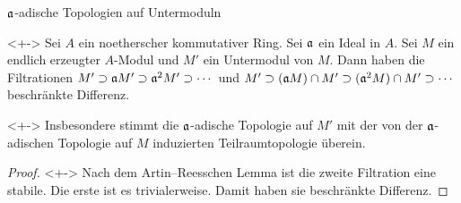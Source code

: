 \begin{frame}{\(\mathfrak{a}\)-adische Topologien auf Untermoduln}
	\begin{theorem}<+->
		Sei \(A\) ein noetherscher kommutativer Ring. Sei \(\mathfrak{a}\) ein
		Ideal in \(A\). Sei \(M\) ein endlich erzeugter \(A\)-Modul und
		\(M'\) ein Untermodul von \(M\). Dann haben die Filtrationen
		\(M' \supset \mathfrak{a} M' \supset \mathfrak{a}^2 M' \supset \dotsb\) und
		\(M' \supset (\mathfrak{a} M) \cap M' \supset (\mathfrak{a}^2 M) \cap M'
		\supset \dotsb\) beschränkte Differenz.
	\end{theorem}
	\begin{visibleenv}<+->
		Insbesondere stimmt die \(\mathfrak{a}\)-adische Topologie auf \(M'\) mit
		der von der \(\mathfrak{a}\)-adischen Topologie auf \(M\) induzierten
		Teilraumtopologie überein.
	\end{visibleenv}
	\begin{proof}<+->
		Nach dem Artin--Reesschen Lemma ist die zweite Filtration eine stabile.
		Die erste ist es trivialerweise. Damit haben sie beschränkte Differenz.
	\end{proof}
\end{frame}

